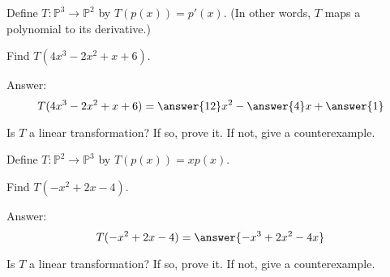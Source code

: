 \documentclass{ximera}
\begin{document}
\begin{problem}
Define $T:\mathbb{P}^3\rightarrow\mathbb{P}^2$ by $T(p(x))=p'(x)$.  (In other words, $T$ maps a polynomial to its derivative.)

\begin{problem}\label{prob:lintransderivative1}
Find $T(4x^3-2x^2+x+6)$.

Answer: $$T(4x^3-2x^2+x+6)=\answer{12}x^2-\answer{4}x+\answer{1}$$
\end{problem}

\begin{problem}\label{prob:lintransderivative2}
Is $T$ a linear transformation?  If so, prove it.  If not, give a counterexample.
\end{problem}
\end{problem}

\begin{problem}
Define $T:\mathbb{P}^2\rightarrow\mathbb{P}^3$ by $T(p(x))=xp(x)$.  

\begin{problem}\label{prob:lintransmultbyx1}
Find $T(-x^2+2x-4)$.

Answer: $$T(-x^2+2x-4)=\answer{-x^3+2x^2-4x}$$
\end{problem}

\begin{problem}\label{prob:lintransmultbyx2}
Is $T$ a linear transformation?  If so, prove it.  If not, give a counterexample.
\end{problem}
\end{problem}
\end{document}
